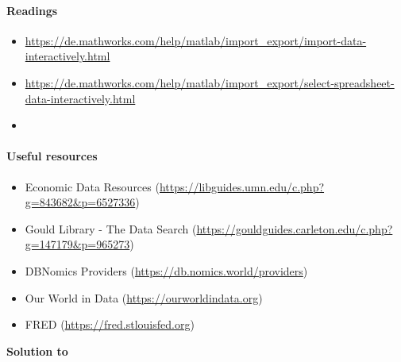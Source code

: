 \paragraph{Readings}
\begin{itemize}
	\item \url{https://de.mathworks.com/help/matlab/import_export/import-data-interactively.html}
	\item \url{https://de.mathworks.com/help/matlab/import_export/select-spreadsheet-data-interactively.html}
	\item \textcite[Ch.2]{Bjornland.Thorsrud_2015_AppliedTimeSeries}	
\end{itemize}

\paragraph{Useful resources}
\begin{itemize}	
	\item Economic Data Resources (\url{https://libguides.umn.edu/c.php?g=843682&p=6527336})
	\item Gould Library - The Data Search (\url{https://gouldguides.carleton.edu/c.php?g=147179&p=965273})
	\item DBNomics Providers (\url{https://db.nomics.world/providers})
	\item Our World in Data (\url{https://ourworldindata.org})
	\item FRED (\url{https://fred.stlouisfed.org})
\end{itemize}

\begin{solution}\textbf{Solution to }
\ifDisplaySolutions

\fi
\newpage
\end{solution}